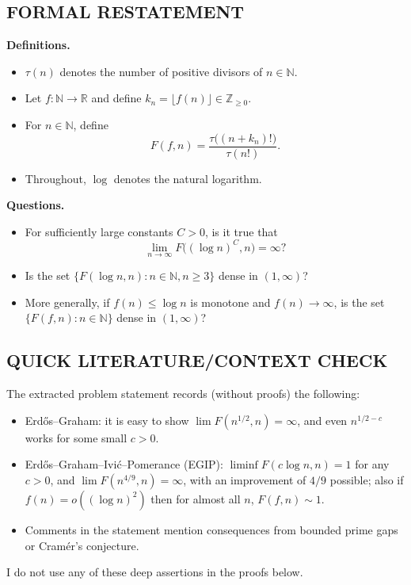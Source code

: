 
\subsection*{FORMAL RESTATEMENT}
\textbf{Definitions.}
\begin{itemize}
\item $\tau(n)$ denotes the number of positive divisors of $n\in\mathbb{N}$.
\item Let $f:\mathbb{N}\to\mathbb{R}$ and define $k_n=\lfloor f(n)\rfloor\in\mathbb{Z}_{\ge 0}$.
\item For $n\in\mathbb{N}$, define
\[
F(f,n)=\frac{\tau\big((n+k_n)!\big)}{\tau(n!)}.
\]
\item Throughout, $\log$ denotes the natural logarithm.
\end{itemize}

\textbf{Questions.}
\begin{itemize}
\item[(Q1)] For sufficiently large constants $C>0$, is it true that
\[
\lim_{n\to\infty} F\big((\log n)^C,n\big)=\infty?
\]
\item[(Q2)] Is the set $\{F(\log n,n): n\in\mathbb{N}, n\ge 3\}$ dense in $(1,\infty)$?
\item[(Q3)] More generally, if $f(n)\le \log n$ is monotone and $f(n)\to\infty$, is the set $\{F(f,n):n\in\mathbb{N}\}$ dense in $(1,\infty)$?
\end{itemize}

\subsection*{QUICK LITERATURE/CONTEXT CHECK}
The extracted problem statement records (without proofs) the following:
\begin{itemize}
\item Erd\H{o}s--Graham: it is easy to show $\lim F(n^{1/2},n)=\infty$, and even $n^{1/2-c}$ works for some small $c>0$.
\item Erd\H{o}s--Graham--Ivi\'{c}--Pomerance (EGIP): $\liminf F(c\log n,n)=1$ for any $c>0$, and $\lim F(n^{4/9},n)=\infty$, with an improvement of $4/9$ possible; also if $f(n)=o((\log n)^2)$ then for almost all $n$, $F(f,n)\sim 1$.
\item Comments in the statement mention consequences from bounded prime gaps or Cram\'{e}r's conjecture.
\end{itemize}
I do not use any of these deep assertions in the proofs below.

